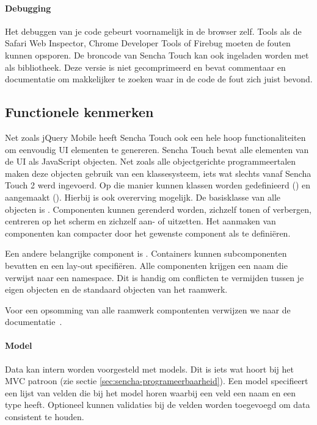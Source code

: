 \paragraph{Debugging}
Het debuggen van je code gebeurt voornamelijk in de browser zelf.  Tools als de Safari Web Inspector,  Chrome Developer Tools of Firebug moeten de fouten kunnen opsporen.  De broncode van Sencha Touch kan ook ingeladen worden met  als bibliotheek.  Deze versie is niet gecomprimeerd en bevat commentaar en documentatie om makkelijker te zoeken waar in de code de fout zich juist bevond.

\subsection{Functionele kenmerken}
Net zoals jQuery Mobile heeft Sencha Touch ook een hele hoop functionaliteiten om eenvoudig UI elementen te genereren.  Sencha Touch bevat alle elementen van de UI als JavaScript objecten.  Net zoals alle objectgerichte programmeertalen maken deze objecten gebruik van een klassesysteem,  iets wat slechts vanaf Sencha Touch 2 werd ingevoerd.  Op die manier kunnen klassen worden gedefinieerd () en aangemaakt ().  Hierbij is ook overerving mogelijk.  De basisklasse van alle objecten is .  Componenten kunnen gerenderd worden, zichzelf tonen of verbergen,  centreren op het scherm en zichzelf aan- of uitzetten.   Het aanmaken van componenten kan compacter door het gewenste component als  te definiëren.  

Een andere belangrijke component is .  Containers kunnen subcomponenten bevatten en een lay-out specifiëren.  Alle componenten krijgen een naam die verwijst naar een namespace.  Dit is handig om conflicten te vermijden tussen je eigen objecten en de standaard objecten van het raamwerk.  

Voor een opsomming van alle raamwerk compontenten verwijzen we naar de documentatie~\cite{Inc.2013a}.


\paragraph{Model}
Data kan intern worden voorgesteld met models.  Dit is iets wat hoort bij het MVC patroon (zie sectie \ref{sec:sencha-programeerbaarheid}).  Een model specifieert een lijst van velden die bij het model horen waarbij een veld een naam en een type heeft.  Optioneel kunnen validaties bij de velden worden toegevoegd om data consistent te houden.  

